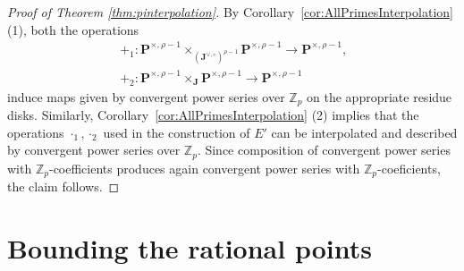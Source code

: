 \documentclass[11pt,oneside]{amsart}
\theoremstyle{plain}
\theoremstyle{definition}
\def\Z{\mathbb{Z}}
\def\J{\mathbf{J}}
\def\Jo{\mathbf{J}^{\vee,\circ}}
\def\P{\mathbf{P}}
\begin{document}
\begin{proof}[Proof of Theorem \ref{thm:pinterpolation}]
By Corollary~\ref{cor:AllPrimesInterpolation} (1), both the operations 
\begin{align*}
& +_1: \P^{\times, \rho-1}\times_{(\Jo)^{\rho-1}}\P^{\times, \rho-1} \longrightarrow \P^{\times, \rho-1},\;\; \\ 
& +_2: \P^{\times, \rho-1}\times_{\J}\P^{\times, \rho-1} \longrightarrow \P^{\times, \rho-1}
 \end{align*} 
 induce maps given by convergent power series over $\Z_p$ on the appropriate residue disks. Similarly, Corollary~\ref{cor:AllPrimesInterpolation} (2) implies that the operations $\cdot_1, \cdot_2$ used in the construction of $E'$ can be interpolated and described by convergent power series over $\Z_p$. Since composition of convergent power series with $\Z_p$-coefficients produces again convergent power series with $\Z_p$-coeficients, the claim follows.
\end{proof}



\section{Bounding the rational points} \label{sec:bound}
\end{document}
